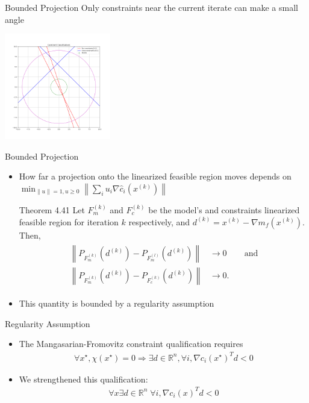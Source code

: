 \documentclass{beamer}
\newcommand{\Rn}{\mathbb R ^ {n}}
\newcommand{\xk}{{{x}^{(k)}}}
\newcommand{\neggrad}{d^{(k)}}
\begin{document}
\begin{frame}{Bounded Projection}
	Only constraints near the current iterate can make a small angle
	\begin{center}
		\includegraphics[width=175px]{images/classification.png}
	\end{center}
\end{frame}


\begin{frame}{Bounded Projection}
	\begin{itemize}
		\item How far a projection onto the linearized feasible region moves depends on
		$
			\min_{\|u\| = 1, u \ge 0} \left\|\sum_{i} u_i \nabla \hat c_i\left(\xk\right)\right\|
		$
		\begin{block}{Theorem 4.41}
			Let $F_m^{(k)}$ and $F_c^{(k)}$ be the model's and constraints linearized feasible region for iteration $k$ respectively,
			and $\neggrad = \xk - \nabla m_f\left(\xk\right)$. Then,
			\begin{align*}
				\begin{array}{ccc}
					\left\|P_{F_m^{(k)}}\left(\neggrad\right)
					-  P_{F_m^{(l)}}\left(\neggrad\right)\right\| & \to 0 & \quad \textrm{and} \\
					\left\|P_{F_m^{(k)}}\left(\neggrad\right)
					-  P_{F_c^{(k)}}\left(\neggrad\right)\right\| & \to 0. &
				\end{array}
			\end{align*}
		\end{block}
		\item This quantity is bounded by a regularity assumption
	\end{itemize}
\end{frame}



\begin{frame}{Regularity Assumption}
\begin{itemize}
\item The Mangasarian-Fromovitz constraint qualification requires
\begin{align*}
\forall x^{\star}, \chi\left(x^{\star}\right) = 0 
\Longrightarrow \exists d \in \Rn, \forall i, \nabla c_i\left(x^{\star}\right)^T d < 0 
\end{align*}
\item We strengthened this qualification:
\begin{align*}
\forall x \exists d \in \Rn\; \forall i, \nabla c_i\left(x\right)^T d < 0
\end{align*}
\end{itemize}
\end{frame}
\end{document}
